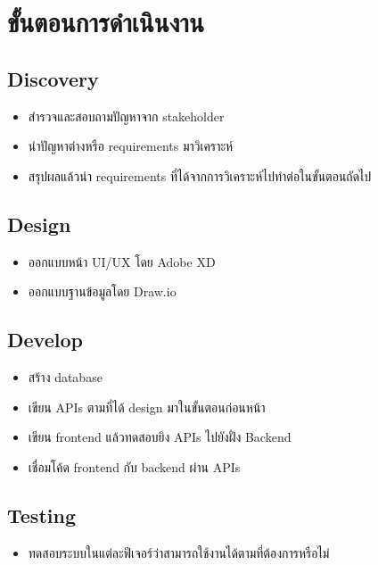 \section{ขั้นตอนการดำเนินงาน}
\subsection{Discovery}
\begin{itemize}
  \item สำรวจและสอบถามปัญหาจาก stakeholder
  \item นำปัญหาต่างหรือ requirements มาวิเคราะห์
  \item สรุปผลแล้วนำ requirements ที่ได้จากการวิเคราะห์ไปทำต่อในขั้นตอนถัดไป
\end{itemize}

\subsection{Design}
\begin{itemize}
  \item ออกแบบหน้า UI/UX โดย Adobe XD
  \item ออกแบบฐานข้อมูลโดย Draw.io
\end{itemize}

\subsection{Develop}
\begin{itemize}
  \item สร้าง database
  \item เขียน APIs ตามที่ได้ design มาในขั้นตอนก่อนหน้า
  \item เขียน frontend แล้วทดสอบยิง APIs ไปยังฝั่ง Backend
  \item เชื่อมโค้ด frontend กับ backend ผ่าน APIs
\end{itemize}

\subsection{Testing}
\begin{itemize}
  \item ทดสอบระบบในแต่ละฟีเจอร์ว่าสามารถใช้งานได้ตามที่ต้องการหรือไม่
\end{itemize}

